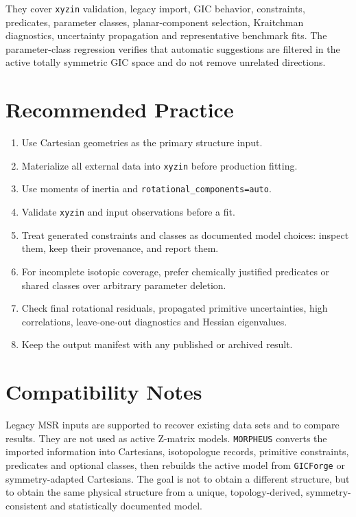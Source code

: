 \documentclass[11pt]{article}
\newcommand{\program}{\texttt{MORPHEUS}}
\newcommand{\xyzin}{\texttt{xyzin}}
\newcommand{\gicforge}{\texttt{GICForge}}
\begin{document}
\noindent
They cover \xyzin{} validation, legacy import, GIC behavior,
constraints, predicates, parameter classes, planar-component selection,
Kraitchman diagnostics, uncertainty propagation and representative benchmark
fits.  The parameter-class regression verifies that automatic suggestions are
filtered in the active totally symmetric GIC space and do not remove unrelated
directions.

\section{Recommended Practice}

\begin{enumerate}
  \item Use Cartesian geometries as the primary structure input.
  \item Materialize all external data into \xyzin{} before production fitting.
  \item Use moments of inertia and \texttt{rotational\_components=auto}.
  \item Validate \xyzin{} and input observations before a fit.
  \item Treat generated constraints and classes as documented model choices:
        inspect them, keep their provenance, and report them.
  \item For incomplete isotopic coverage, prefer chemically justified
        predicates or shared classes over arbitrary parameter deletion.
  \item Check final rotational residuals, propagated primitive uncertainties,
        high correlations, leave-one-out diagnostics and Hessian eigenvalues.
  \item Keep the output manifest with any published or archived result.
\end{enumerate}

\section{Compatibility Notes}

Legacy MSR inputs are supported to recover existing data sets and to compare
results.  They are not used as active Z-matrix models.  \program{} converts the
imported information into Cartesians, isotopologue records, primitive
constraints, predicates and optional classes, then rebuilds the active model
from \gicforge{} or symmetry-adapted Cartesians.  The goal is not to obtain a
different structure, but to obtain the same physical structure from a unique,
topology-derived, symmetry-consistent and statistically documented model.
\end{document}
